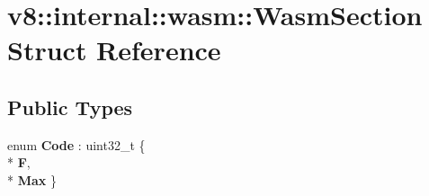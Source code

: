 \hypertarget{structv8_1_1internal_1_1wasm_1_1_wasm_section}{}\section{v8\+:\+:internal\+:\+:wasm\+:\+:Wasm\+Section Struct Reference}
\label{structv8_1_1internal_1_1wasm_1_1_wasm_section}
\subsection*{Public Types}
\begin{DoxyCompactItemize}
\item 
enum {\bfseries Code} \+: uint32\+\_\+t \{ \\*
{\bfseries F}, 
\\*
{\bfseries Max}
 \}\hypertarget{structv8_1_1internal_1_1wasm_1_1_wasm_section_ac90d229b96d3a64edb7e4f957ecd2bbf}{}\label{structv8_1_1internal_1_1wasm_1_1_wasm_section_ac90d229b96d3a64edb7e4f957ecd2bbf}

\end{DoxyCompactItemize}
